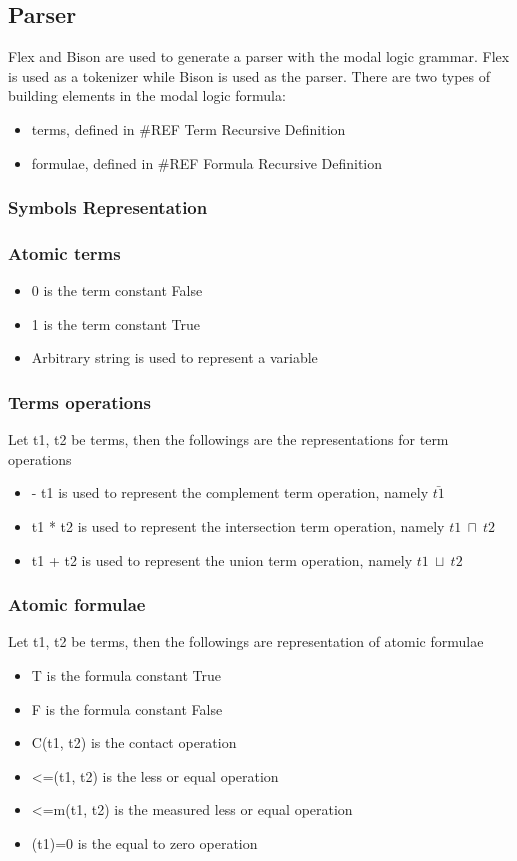 \documentclass{article}
\begin{document}
	\subsection{Parser}
		Flex and Bison are used to generate a parser with the modal logic grammar.
		Flex is used as a tokenizer while Bison is used as the parser.
		\newline
		There are two types of building elements in the modal logic formula:
		\begin{itemize}
			\item terms, defined in \#REF Term Recursive Definition
			\item formulae, defined in \#REF Formula Recursive Definition
		\end{itemize}
		
	\subsubsection{Symbols Representation}
		\subsubsection*{Atomic terms}
		\begin{itemize}
			\item 0 is the term constant False
			\item 1 is the term constant True
			\item Arbitrary string is used to represent a variable
		\end{itemize}
		
		\subsubsection*{Terms operations}
		Let t1, t2 be terms, then the followings are the representations for term operations
		\begin{itemize}
			\item - t1 is used to represent the complement term operation, namely $\bar{t1}$
			\item t1 * t2 is used to represent the intersection term operation, namely $t1 \: \sqcap \: t2$
			\item t1 + t2 is used to represent the union term operation, namely $t1 \: \sqcup \: t2$
		\end{itemize}
		
		\subsubsection*{Atomic formulae}
		Let t1, t2 be terms, then the followings are representation of atomic formulae
		\begin{itemize}
			\item T is the formula constant True
			\item F is the formula constant False
			\item C(t1, t2) is the contact operation
			\item <=(t1, t2) is the less or equal operation
			\item <=m(t1, t2) is the measured less or equal operation
			\item (t1)=0 is the equal to zero operation
		\end{itemize}
\end{document}
